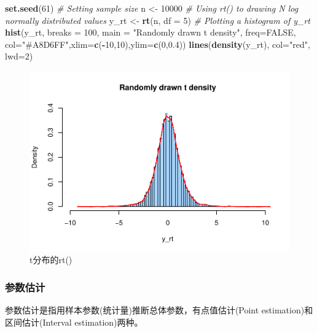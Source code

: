\documentclass[
]{article}
\newenvironment{Shaded}{\begin{snugshade}}{\end{snugshade}}
\newcommand{\CommentTok}[1]{\textcolor[rgb]{0.56,0.35,0.01}{\textit{#1}}}
\newcommand{\DataTypeTok}[1]{\textcolor[rgb]{0.13,0.29,0.53}{#1}}
\newcommand{\DecValTok}[1]{\textcolor[rgb]{0.00,0.00,0.81}{#1}}
\newcommand{\FloatTok}[1]{\textcolor[rgb]{0.00,0.00,0.81}{#1}}
\newcommand{\KeywordTok}[1]{\textcolor[rgb]{0.13,0.29,0.53}{\textbf{#1}}}
\newcommand{\NormalTok}[1]{#1}
\newcommand{\OperatorTok}[1]{\textcolor[rgb]{0.81,0.36,0.00}{\textbf{#1}}}
\newcommand{\OtherTok}[1]{\textcolor[rgb]{0.56,0.35,0.01}{#1}}
\newcommand{\StringTok}[1]{\textcolor[rgb]{0.31,0.60,0.02}{#1}}
\begin{document}
\begin{Shaded}
\begin{Highlighting}[]
\KeywordTok{set.seed}\NormalTok{(}\DecValTok{61}\NormalTok{)}
\CommentTok{# Setting sample size}
\NormalTok{n <-}\StringTok{ }\DecValTok{10000}
\CommentTok{# Using rt() to drawing N log normally distributed values}
\NormalTok{y_rt <-}\StringTok{ }\KeywordTok{rt}\NormalTok{(n, }\DataTypeTok{df =} \DecValTok{5}\NormalTok{)}
\CommentTok{# Plotting a histogram of y_rt}
\KeywordTok{hist}\NormalTok{(y_rt, }\DataTypeTok{breaks =} \DecValTok{100}\NormalTok{, }\DataTypeTok{main =} \StringTok{"Randomly drawn t density"}\NormalTok{, }\DataTypeTok{freq=}\OtherTok{FALSE}\NormalTok{,}
  \DataTypeTok{col=}\StringTok{"#A8D6FF"}\NormalTok{,}\DataTypeTok{xlim=}\KeywordTok{c}\NormalTok{(}\OperatorTok{-}\DecValTok{10}\NormalTok{,}\DecValTok{10}\NormalTok{),}\DataTypeTok{ylim=}\KeywordTok{c}\NormalTok{(}\DecValTok{0}\NormalTok{,}\FloatTok{0.4}\NormalTok{))}
\KeywordTok{lines}\NormalTok{(}\KeywordTok{density}\NormalTok{(y_rt), }\DataTypeTok{col=}\StringTok{"red"}\NormalTok{, }\DataTypeTok{lwd=}\DecValTok{2}\NormalTok{)}
\end{Highlighting}
\end{Shaded}

\begin{figure}

{\centering \includegraphics[width=0.49\linewidth,height=0.49\textheight]{figs/rttest} 

}

\caption{t分布的rt()}\label{fig:rttest}
\end{figure}

\hypertarget{ux53c2ux6570ux4f30ux8ba1}{%
\subsubsection{参数估计}\label{ux53c2ux6570ux4f30ux8ba1}}

参数估计是指用样本参数(统计量)推断总体参数，有点值估计(Point estimation)和区间估计(Interval estimation)两种。
\end{document}
